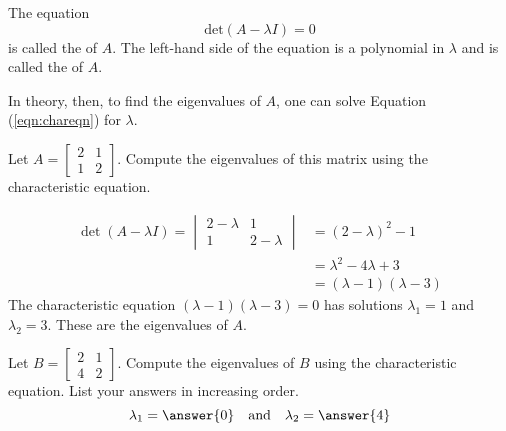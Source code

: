 \documentclass{ximera}
\begin{document}


\begin{definition}\label{def:chareqcharpoly}
The equation 
\begin{equation}\label{eqn:chareqn}
\mbox{det}(A-\lambda I) = 0
\end{equation} 
is called the  of $A$.  The left-hand side of the equation is a polynomial in $\lambda$ and is called the  of $A$.
\end{definition}

In theory, then, to find the eigenvalues of $A$, one can solve Equation (\ref{eqn:chareqn}) for $\lambda$.  

\begin{example}\label{ex:2x2eig}
Let $A=\begin{bmatrix} 2& 1\\ 1&2
\end{bmatrix}$.  Compute the eigenvalues of this matrix using the characteristic equation.
\begin{explanation}
\begin{align*}\det(A-\lambda I)=\begin{vmatrix}2-\lambda&1\\1&2-\lambda\end{vmatrix}&=(2-\lambda)^2-1\\
&=\lambda^2-4\lambda+3\\
&=(\lambda-1)(\lambda-3)
\end{align*}
The characteristic equation $(\lambda-1)(\lambda-3)=0$ has solutions $\lambda_1=1$ and $\lambda_2=3$.  These are the eigenvalues of $A$.
\end{explanation}
\end{example}

\begin{example}\label{ex:2x2eig2}
Let $B=\begin{bmatrix} 2& 1\\ 4&2
\end{bmatrix}$.  Compute the eigenvalues of $B$ using the characteristic equation. List your answers in increasing order.
$$\lambda_1=\answer{0}\quad \mbox{and}\quad \lambda_2=\answer{4}$$
\end{example}
\end{document}
